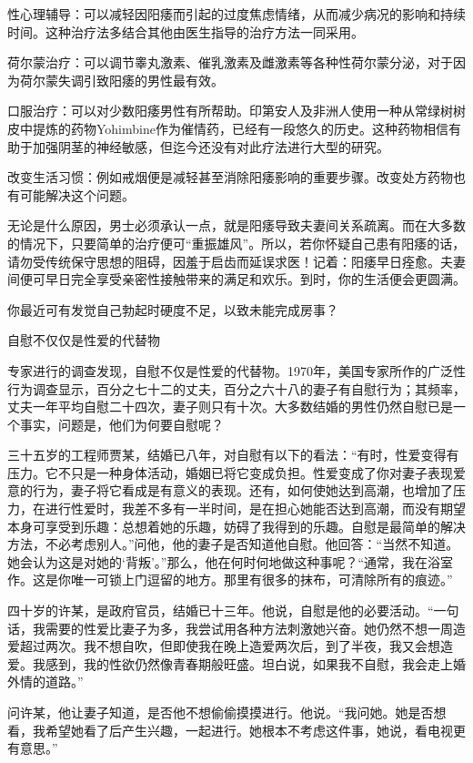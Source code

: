 \documentclass[12pt,UTF8]{ctexbook}
\begin{document}
性心理辅导：可以减轻因阳痿而引起的过度焦虑情绪，从而减少病况的影响和持续时间。这种治疗法多结合其他由医生指导的治疗方法一同采用。

荷尔蒙治疗：可以调节睾丸激素、催乳激素及雌激素等各种性荷尔蒙分泌，对于因为荷尔蒙失调引致阳痿的男性最有效。

口服治疗：可以对少数阳痿男性有所帮助。印第安人及非洲人使用一种从常绿树树皮中提炼的药物Yohimbine作为催情药，已经有一段悠久的历史。这种药物相信有助于加强阴茎的神经敏感，但迄今还没有对此疗法进行大型的研究。

改变生活习惯：例如戒烟便是减轻甚至消除阳痿影响的重要步骤。改变处方药物也有可能解决这个问题。

无论是什么原因，男士必须承认一点，就是阳痿导致夫妻间关系疏离。而在大多数的情况下，只要简单的治疗便可“重振雄风”。所以，若你怀疑自己患有阳痿的话，请勿受传统保守思想的阻碍，因羞于启齿而延误求医！记着：阳痿早日痊愈。夫妻间便可早日完全享受亲密性接触带来的满足和欢乐。到时，你的生活便会更圆满。

你最近可有发觉自己勃起时硬度不足，以致未能完成房事？





自慰不仅仅是性爱的代替物


专家进行的调查发现，自慰不仅是性爱的代替物。1970年，美国专家所作的广泛性行为调查显示，百分之七十二的丈夫，百分之六十八的妻子有自慰行为；其频率，丈夫一年平均自慰二十四次，妻子则只有十次。大多数结婚的男性仍然自慰已是一个事实，问题是，他们为何要自慰呢？

三十五岁的工程师贾某，结婚已八年，对自慰有以下的看法：“有时，性爱变得有压力。它不只是一种身体活动，婚姻已将它变成负担。性爱变成了你对妻子表现爱意的行为，妻子将它看成是有意义的表现。还有，如何使她达到高潮，也增加了压力，在进行性爱时，我差不多有一半时间，是在担心她能否达到高潮，而没有期望本身可享受到乐趣：总想着她的乐趣，妨碍了我得到的乐趣。自慰是最简单的解决方法，不必考虑别人。”问他，他的妻子是否知道他自慰。他回答：“当然不知道。她会认为这是对她的‘背叛’。”那么，他在何时何地做这种事呢？“通常，我在浴室作。这是你唯一可锁上门逗留的地方。那里有很多的抹布，可清除所有的痕迹。”

四十岁的许某，是政府官员，结婚已十三年。他说，自慰是他的必要活动。“一句话，我需要的性爱比妻子为多，我尝试用各种方法刺激她兴奋。她仍然不想一周造爱超过两次。我不想自吹，但即使我在晚上造爱两次后，到了半夜，我又会想造爱。我感到，我的性欲仍然像青春期般旺盛。坦白说，如果我不自慰，我会走上婚外情的道路。”

问许某，他让妻子知道，是否他不想偷偷摸摸进行。他说。“我问她。她是否想看，我希望她看了后产生兴趣，一起进行。她根本不考虑这件事，她说，看电视更有意思。”
\end{document}
